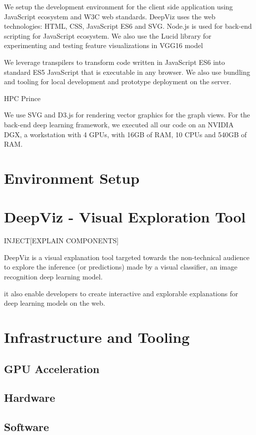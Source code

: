 We setup the development environment for the client side application using JavaScript ecosystem and W3C web standards. DeepViz uses the web technologies: HTML, CSS, JavaScript ES6 and SVG. Node.js is used for back-end scripting for JavaScript ecosystem. We also use the Lucid library for experimenting and testing feature visualizations in VGG16 model

We leverage transpilers to transform code written in JavaScript ES6 into standard ES5 JavaScript that is executable in any browser. We also use bundling and tooling for local development and prototype deployment on the server.

HPC Prince

We use SVG and D3.js for rendering vector graphics for the graph views. For the back-end deep learning framework, we executed all our code on an NVIDIA DGX, a workstation with 4 GPUs, with 16GB of RAM, 10 CPUs and 540GB of RAM.

\section{Environment Setup}

\section{DeepViz - Visual Exploration Tool}

INJECT[EXPLAIN COMPONENTS]

DeepViz is a visual explanation tool targeted towards the non-technical audience to explore the inference (or predictions) made by a visual classifier, an image recognition deep learning model.

it also enable developers to create interactive and explorable explanations for deep learning models on the web.

\iffalse
\section{Infrastructure and Tooling}
    \subsection{GPU Acceleration}
\subsection{Hardware}
\subsection{Software}
